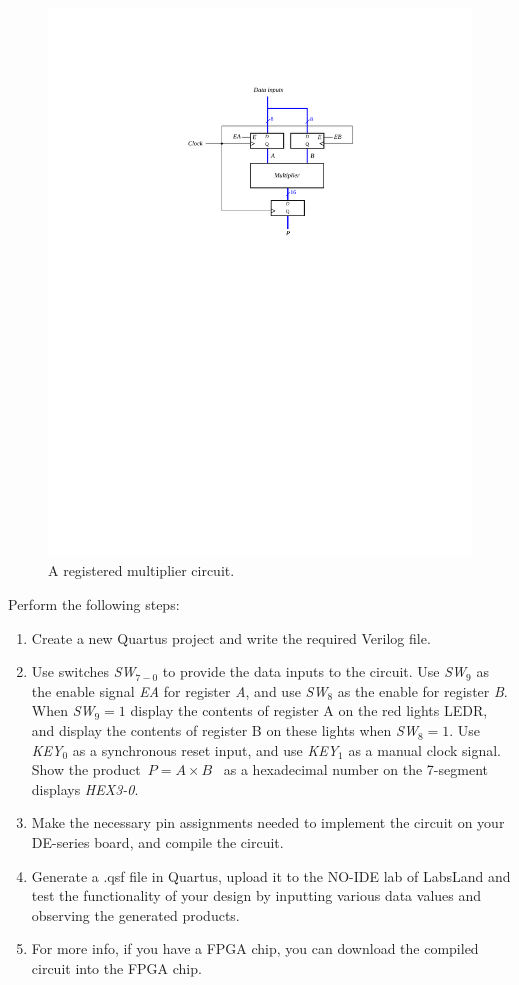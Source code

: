 \documentclass[epsfig,10pt,fullpage]{article}
\begin{document}
\begin{figure}[H]
\centerline{
\includegraphics{figures/registered_mult}}
\caption{A registered multiplier circuit.}
\label{fig:registered_mult}
\end{figure}

Perform the following steps:
\begin{enumerate}
\item Create a new Quartus project and write the required Verilog file.
\item Use switches {\it SW}$_{7-0}$ to provide the data inputs to the circuit. Use
{\it SW}$_9$ as the enable signal {\it EA} for register {\it A}, and use {\it SW}$_8$
as the enable for register {\it B}.  When {\it SW}$_9 = 1$ display the contents of
register A on the red lights LEDR, and display the contents of register B on these lights
when {\it SW}$_8 = 1$. Use {\it KEY}$_0$ as a synchronous reset input, and use 
{\it KEY}$_1$ as a manual clock signal.  Show the product~$P = A \times B$~ as a
hexadecimal number on the 7-segment displays {\it HEX3-0}.
\item Make the necessary pin assignments needed to implement the circuit on your
DE-series board, and compile the circuit.
\item Generate a .qsf file in Quartus, upload it to the NO-IDE lab of LabsLand and test the functionality of your design by inputting various data values and observing
the generated products.
\item For more info, if you have a FPGA chip, you can download the compiled circuit into the FPGA chip.
\end{enumerate}
\end{document}
